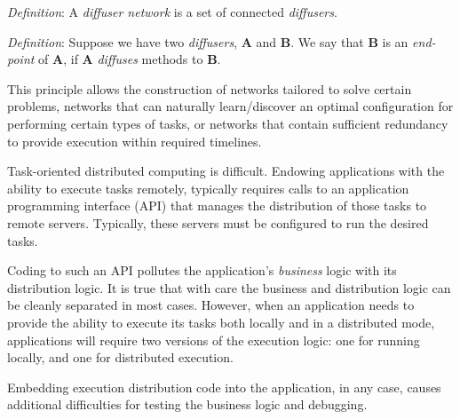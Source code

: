 \documentclass[11pt]{amsart}
\begin{document}
\begin{description}
	\emph{Definition}: A \emph{diffuser network} is a set of connected \emph{diffusers}.
	
	\emph{Definition}: Suppose we have two \emph{diffusers}, \textbf{A} and \textbf{B}. We say that \textbf{B} is an \emph{end-point} of \textbf{A}, if \textbf{A} \emph{diffuses} methods to \textbf{B}.
	
	This principle allows the construction of networks tailored to solve certain problems, networks that can naturally learn/discover an optimal configuration for performing certain types of tasks, or networks that contain sufficient redundancy to provide execution within required timelines.

\end{description}


Task-oriented distributed computing is difficult. Endowing applications with the ability to execute tasks remotely, typically requires calls to an application programming interface (API) that manages the distribution of those tasks to remote servers. Typically, these servers must be configured to run the desired tasks.

Coding to such an API pollutes the application's \emph{business} logic with its distribution logic. It is true that with care the business and distribution logic can be cleanly separated in most cases. However, when an application needs to provide the ability to execute its tasks both locally and in a distributed mode, applications will require two versions of the execution logic: one for running locally, and one for distributed execution.

Embedding execution distribution code into the application, in any case, causes additional difficulties for testing the business logic and debugging. 

\end{document}
